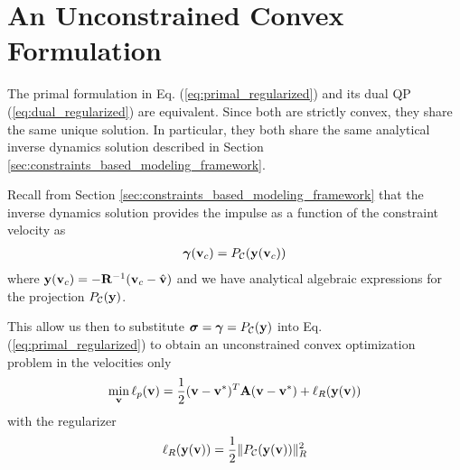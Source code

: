 \section{An Unconstrained Convex Formulation}
\label{sec:unconstrained_convex_formulation}

The primal formulation in Eq. (\ref{eq:primal_regularized}) and its dual QP 
(\ref{eq:dual_regularized}) are equivalent.  Since both are strictly convex, they
share the same unique solution. In particular, they both share the same
analytical inverse dynamics solution described in Section
\ref{sec:constraints_based_modeling_framework}. 

Recall from Section \ref{sec:constraints_based_modeling_framework} that the
inverse dynamics solution provides the impulse as a function of the constraint
velocity as
\begin{eqnarray}
	{\bm\gamma}({\mathbf{v}}_c) = P_\mathcal{C}({\mathbf{y}}({\mathbf{v}}_c))
\end{eqnarray}
where ${\mathbf{y}}({\mathbf{v}}_c) = -{\mathbf{R}}^{-1}({\mathbf{v}}_c-\hat{{\mathbf{v}}})$ and we have
analytical algebraic expressions for the projection $P_\mathcal{C}({\mathbf{y}})$.

This allow us then to substitute ${\bm\sigma}={\bm\gamma}=P_\mathcal{C}({\mathbf{y}})$
into Eq. (\ref{eq:primal_regularized}) to obtain an unconstrained convex
optimization problem in the velocities only
\begin{eqnarray}
	\min_{\mf{v}} \ell_p(\mf{v}) =
	\frac{1}{2}(\mf{v}-\mf{v}^*)^T\mf{A}(\mf{v}-\mf{v}^*) +
	\ell_R(\mf{y}(\mf{v}))
	\label{eq:primal_unconstrained}
\end{eqnarray}
with the regularizer
\begin{equation}
	\ell_R({\mathbf{y}}({\mathbf{v}})) = \frac{1}{2}\Vert P_\mathcal{C}({\mathbf{y}}({\mathbf{v}}))\Vert_R^2
\end{equation}

